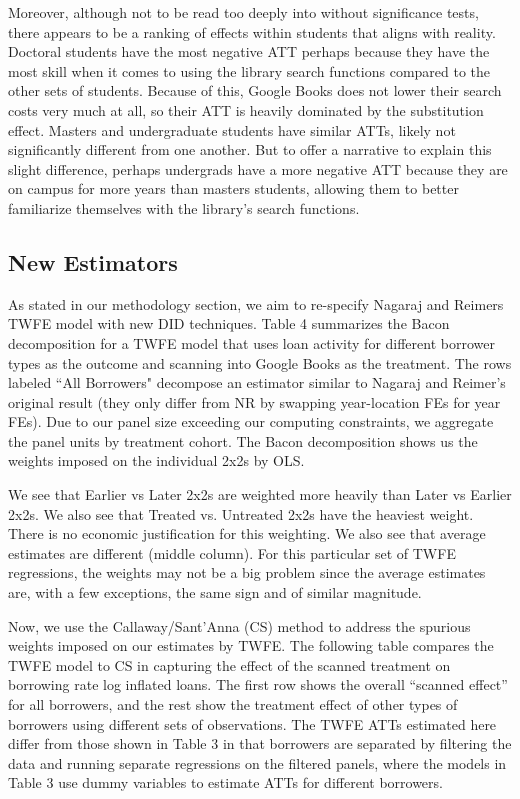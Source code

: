 \documentclass{article}
\begin{document}
Moreover, although not to be read too deeply into without significance tests, there appears to be a ranking of effects within students that aligns with reality. Doctoral students have the most negative ATT perhaps because they have the most skill when it comes to using the library search functions compared to the other sets of students. Because of this, Google Books does not lower their search costs very much at all, so their ATT is heavily dominated by the substitution effect. Masters and undergraduate students have similar ATTs, likely not significantly different from one another. But to offer a narrative to explain this slight difference, perhaps undergrads have a more negative ATT because they are on campus for more years than masters students, allowing them to better familiarize themselves with the library's search functions. 

\subsection{New Estimators}

As stated in our methodology section, we aim to re-specify Nagaraj and Reimers TWFE model with new DID techniques. Table 4 summarizes the Bacon decomposition for a TWFE model that uses loan activity for different borrower types as the outcome and scanning into Google Books as the treatment. The rows labeled ``All Borrowers" decompose an estimator similar to Nagaraj and Reimer's original result (they only differ from NR by swapping year-location FEs for year FEs). Due to our panel size exceeding our computing constraints, we aggregate the panel units by treatment cohort. The Bacon decomposition shows us the weights imposed on the individual 2x2s by OLS. 

We see that Earlier vs Later 2x2s are weighted more heavily than Later vs Earlier 2x2s. We also see that Treated vs. Untreated 2x2s have the heaviest weight. There is no economic justification for this weighting. We also see that average estimates are different (middle column).  For this particular set of TWFE regressions, the weights may not be a big problem since the average estimates are, with a few exceptions, the same sign and of similar magnitude. 



Now, we use the Callaway/Sant’Anna (CS) method to address the spurious weights imposed on our estimates by TWFE. The following table compares the TWFE model to CS in capturing the effect of the scanned treatment on borrowing rate log inflated loans. The first row shows the overall “scanned effect” for all borrowers, and the rest show the treatment effect of other types of borrowers using different sets of observations. The TWFE ATTs estimated here differ from those shown in Table 3 in that borrowers are separated by filtering the data and running separate regressions on the filtered panels, where the models in Table 3 use dummy variables to estimate ATTs for different borrowers. 
\end{document}
